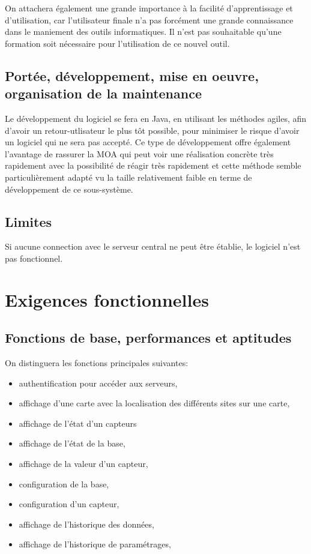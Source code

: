 On attachera également une grande importance à la facilité d'apprentissage et d'utilisation, car l'utilisateur finale n'a pas forcément une grande connaissance dans le maniement des outils informatiques. Il n'est pas souhaitable qu'une formation soit nécessaire pour l'utilisation de ce nouvel outil.

\subsection{Portée, développement, mise en oeuvre, organisation de la maintenance}
Le développement du logiciel se fera en Java, en utilisant les méthodes agiles, afin d'avoir un retour-utlisateur le plus tôt possible, pour minimiser le risque d'avoir un logiciel qui ne sera pas accepté. Ce type de développement offre également l'avantage de rassurer la MOA qui peut voir une réalisation concrète très rapidement avec la possibilité de réagir très rapidement et cette méthode semble particulièrement adapté vu la taille relativement faible en terme de développement de ce sous-système. 

\subsection{Limites}
Si aucune connection avec le serveur central ne peut être établie, le logiciel n'est pas fonctionnel. 

\section{Exigences fonctionnelles}
\subsection{Fonctions de base, performances et aptitudes}
On distinguera les fonctions principales suivantes:
\begin{itemize}
	\item authentification pour accéder aux serveurs,
	\item affichage d'une carte avec la localisation des différents sites sur une carte,
	\item affichage de l'état d'un capteurs
	\item affichage de l'état de la base,
	\item affichage de la valeur d'un capteur,
	\item configuration de la base,
	\item configuration d'un capteur,
	\item affichage de l'historique des données,
	\item affichage de l'historique de paramétrages,
\end{itemize}

